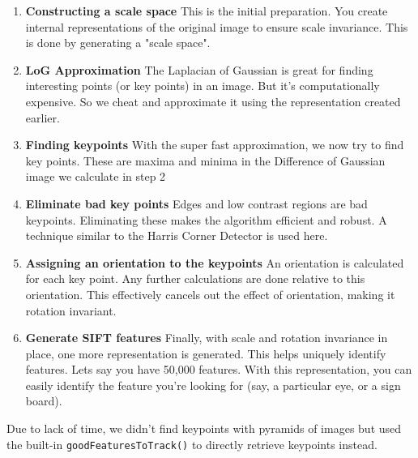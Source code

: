 \documentclass{ee208report}
\begin{document}
\begin{multicols*}{2}
\begin{enumerate}
    \item \textbf{Constructing a scale space} This is the initial preparation.
    You create internal representations of the original image to ensure scale
    invariance. This is done by generating a "scale space".
    \item \textbf{LoG Approximation} The Laplacian of Gaussian is great for
    finding interesting points (or key points) in an image. But it's computationally
    expensive. So we cheat and approximate it using the representation created
    earlier.
    \item \textbf{Finding keypoints} With the super fast approximation, we now
    try to find key points. These are maxima and minima in the Difference of
    Gaussian image we calculate in step 2
    \item \textbf{Eliminate bad key points} Edges and low contrast regions are
    bad keypoints. Eliminating these makes the algorithm efficient and robust. A
    technique similar to the Harris Corner Detector is used here.
    \item \textbf{Assigning an orientation to the keypoints} An orientation is
    calculated for each key point. Any further calculations are done relative to
    this orientation. This effectively cancels out the effect of orientation, making
    it rotation invariant.
    \item \textbf{Generate SIFT features} Finally, with scale and rotation
    invariance in place, one more representation is generated. This helps uniquely
    identify features. Lets say you have 50,000 features. With this representation,
    you can easily identify the feature you're looking for (say, a particular eye,
    or a sign board).
\end{enumerate}

Due to lack of time, we didn't find keypoints with pyramids of images but used
the built-in \texttt{goodFeaturesToTrack()} to directly retrieve keypoints
instead.




\end{multicols*}
\end{document}
